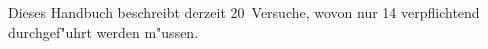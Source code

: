Dieses Handbuch beschreibt derzeit 20~Versuche, wovon nur 14
verpflichtend durchgef"uhrt werden m"ussen. %




